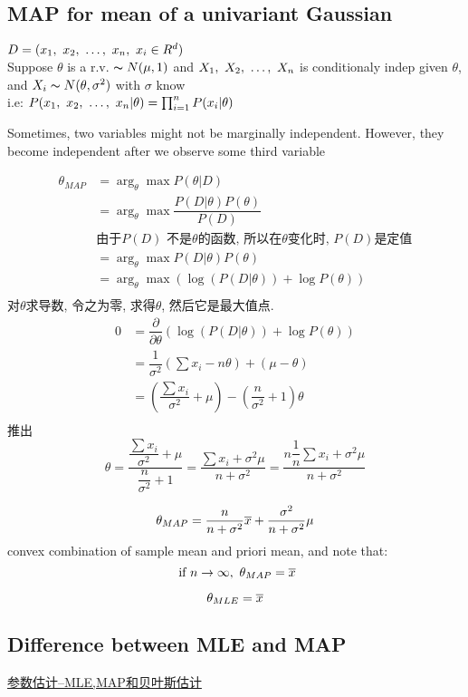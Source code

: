 \documentclass{article}
\begin{document}
\subsection{MAP for mean of a univariant Gaussian}
$D = (x_1,~x_2,~\ldots,~x_n,\ x_i \in R^d)$\\
Suppose $\theta$ is a r.v. $\thicksim{N}(\mu, 1)$ and $X_1,~X_2,~\ldots,~X_n$ is conditionaly indep given $\theta$, 
and $X_i \thicksim{N}(\theta, \sigma^2)$ with $\sigma$ know\\
i.e: $P(x_1,~x_2,~\ldots,~x_n|\theta) = \prod_{i =1}^n P(x_i|\theta)$

Sometimes, two variables might not be marginally independent. However, they become independent after we observe some third variable

$$
\begin{aligned}
\theta_{MAP} 
& = \arg_\theta \max P(\theta | D)\\ 
& = \arg_\theta \max \dfrac{P(D|\theta) P(\theta)}{P(D)}\\ 
& \text{由于$P(D)$ 不是$\theta$的函数, 所以在$\theta$变化时, $P(D)$是定值}\\ 
& = \arg_\theta \max P(D|\theta) P(\theta)\\ 
& = \arg_\theta \max (\log(P(D|\theta)) + \log P(\theta))\\ 
\end{aligned}
$$
对$\theta$求导数, 令之为零, 求得$\theta$, 然后它是最大值点.
$$
\begin{aligned}
0 
& = \dfrac{\partial}{\partial \theta} (\log(P(D|\theta)) + \log P(\theta))\\
& = \dfrac{1}{\sigma^2} (\sum x_i - n \theta) + (\mu - \theta)\\
& = (\dfrac{\sum x_i}{\sigma^2} + \mu) - (\dfrac{n}{\sigma^2} + 1)\theta\\
\end{aligned}
$$
推出
$$
\theta 
= \dfrac{\dfrac{\sum x_i}{\sigma^2} + \mu}{\dfrac{n}{\sigma^2} + 1}
= \dfrac{\sum x_i + \sigma^2 \mu}{n + \sigma^2}
= \dfrac{n \dfrac{1}{n} \sum x_i + \sigma^2 \mu}{n + \sigma^2}
$$

$$ \theta_{MAP} = \dfrac{n}{n + \sigma^2} \overline{x} + \dfrac{\sigma^2}{n + \sigma^2} \mu $$
convex combination of sample mean and priori mean, and note that: 
$$\textrm{\ if } n \to \infty,\ \theta_{MAP} = \overline{x}$$

$$ \theta_{MLE} = \overline{x} $$

\subsection{Difference between MLE and MAP}
\href{http://blog.163.com/silence\_ellen/blog/static/1761042222014413112444364/}{参数估计--MLE,MAP和贝叶斯估计}
\end{document}
